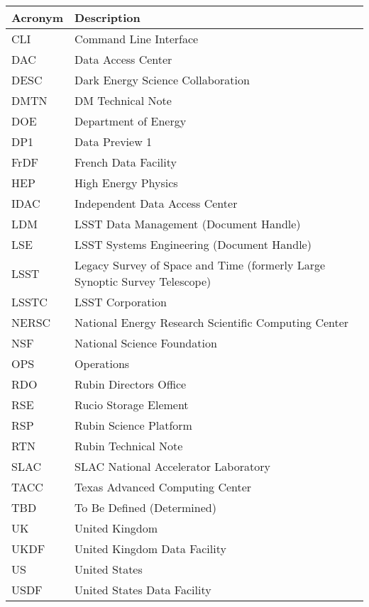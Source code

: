 \addtocounter{table}{-1}
\begin{longtable}{p{}p{}}\hline
\textbf{Acronym} & \textbf{Description}  \\\hline

CLI & Command Line Interface \\\hline
DAC & Data Access Center \\\hline
DESC & Dark Energy Science Collaboration \\\hline
DMTN & DM Technical Note \\\hline
DOE & Department of Energy \\\hline
DP1 & Data Preview 1 \\\hline
FrDF & French Data Facility \\\hline
HEP &  High Energy Physics \\\hline
IDAC & Independent Data Access Center \\\hline
LDM & LSST Data Management (Document Handle) \\\hline
LSE & LSST Systems Engineering (Document Handle) \\\hline
LSST & Legacy Survey of Space and Time (formerly Large Synoptic Survey Telescope) \\\hline
LSSTC & LSST Corporation \\\hline
NERSC & National Energy Research Scientific Computing Center \\\hline
NSF & National Science Foundation \\\hline
OPS & Operations \\\hline
RDO & Rubin Directors Office \\\hline
RSE & Rucio Storage Element \\\hline
RSP & Rubin Science Platform \\\hline
RTN & Rubin Technical Note \\\hline
SLAC & SLAC National Accelerator Laboratory \\\hline
TACC & Texas Advanced Computing Center \\\hline
TBD & To Be Defined (Determined) \\\hline
UK & United Kingdom \\\hline
UKDF & United Kingdom Data Facility \\\hline
US & United States \\\hline
USDF & United States Data Facility \\\hline
\end{longtable}

